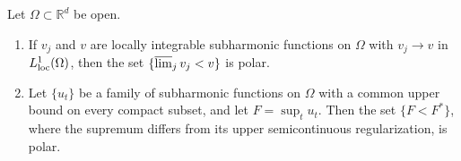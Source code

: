 \begin{theorem}\label{thm:polar-limit-discrepancy}
Let $\Omega\subset\mathbb R^d$ be open.
\begin{enumerate}
\item If $v_j$ and $v$ are locally integrable subharmonic functions on $\Omega$ with $v_j\to v$ in $L^1_{\mathrm{loc}}(\Omega)$, then the set $\{\varlimsup_jv_j<v\}$ is polar.
\item Let $\{u_t\}$ be a family of subharmonic functions on $\Omega$ with a common upper bound on every compact subset, and let $F=\sup_tu_t$. Then the set $\{F<F^*\}$, where the supremum differs from its upper semicontinuous regularization, is polar.
\end{enumerate}
\end{theorem}
